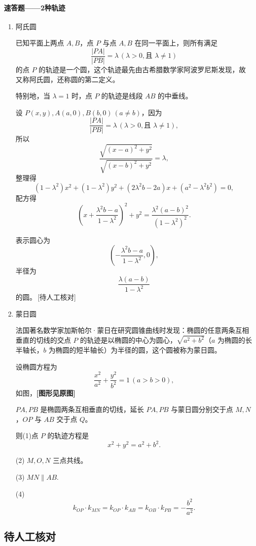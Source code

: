 \documentclass[UTF8,a4paper,11pt]{ctexart}
\begin{document}
\paragraph{速答题——2种轨迹}
\begin{enumerate}
  \item 阿氏圆

  已知平面上两点 $A,B$，点 $P$ 与点 $A,B$ 在同一平面上，则所有满足
  \[
  \frac{|PA|}{|PB|}=\lambda\,(\lambda>0,\text{且 }\lambda\ne 1)
  \]
  的点 $P$ 的轨迹是一个圆，这个轨迹最先由古希腊数学家阿波罗尼斯发现，故又称阿氏圆，还称圆的第二定义。

  特别地，当 $\lambda=1$ 时，点 $P$ 的轨迹是线段 $AB$ 的中垂线。

  设 $P(x,y),A(a,0),B(b,0)\,(a\ne b)$，因为
  \[
  \frac{|PA|}{|PB|}=\lambda\,(\lambda>0,\text{且 }\lambda\ne 1),
  \]
  所以
  \[
  \frac{\sqrt{(x-a)^2+y^2}}{\sqrt{(x-b)^2+y^2}}=\lambda,
  \]
  整理得
  \[
  (1-\lambda^2)x^2+(1-\lambda^2)y^2+(2\lambda^2b-2a)x+(a^2-\lambda^2b^2)=0,
  \]
  配方得
  \[
  \left(x+\frac{\lambda^2b-a}{1-\lambda^2}\right)^2+y^2=\frac{\lambda^2(a-b)^2}{(1-\lambda^2)^2}.
  \]

  表示圆心为
  \[
  \left(-\frac{\lambda^2b-a}{1-\lambda^2},0\right),
  \]
  半径为
  \[
  \frac{\lambda(a-b)}{1-\lambda^2}
  \]
  的圆。\,[待人工核对]

  \item 蒙日圆

  法国著名数学家加斯帕尔·蒙日在研究圆锥曲线时发现：椭圆的任意两条互相垂直的切线的交点 $P$ 的轨迹是以椭圆的中心为圆心，$\sqrt{a^2+b^2}$（$a$ 为椭圆的长半轴长，$b$ 为椭圆的短半轴长）为半径的圆，这个圆被称为蒙日圆。

  设椭圆方程为
  \[
  \frac{x^2}{a^2}+\frac{y^2}{b^2}=1\,(a>b>0),
  \]
  如图，\textbf{[图形见原图]}

  $PA,PB$ 是椭圆两条互相垂直的切线，延长 $PA,PB$ 与蒙日圆分别交于点 $M,N$，$OP$ 与 $AB$ 交于点 $Q$。

  则(1)点 $P$ 的轨迹方程是
  \[
  x^2+y^2=a^2+b^2.
  \]

  (2) $M,O,N$ 三点共线。

  (3) $MN\parallel AB$.

  (4)
  \[
  k_{OP}\cdot k_{MN}=k_{OP}\cdot k_{AB}=k_{OB}\cdot k_{PB}=-\frac{b^2}{a^2}.
  \]
\end{enumerate}

\subsection*{待人工核对}
\end{document}
